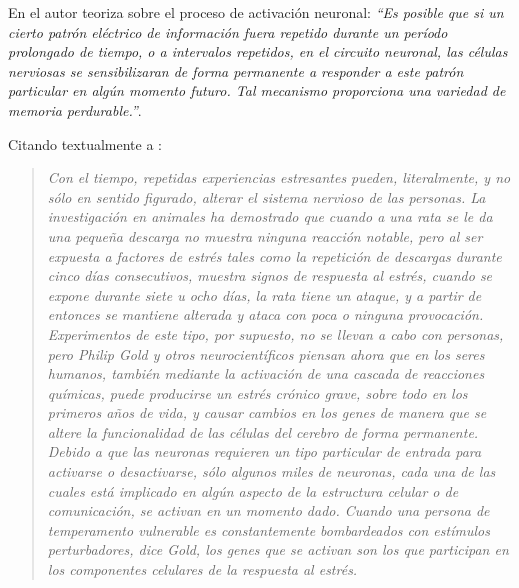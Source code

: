 
En \cite{MacLean} el autor teoriza sobre el proceso de activación neuronal: {\it ``Es posible que si un cierto patrón eléctrico de información fuera repetido durante un período prolongado de tiempo, o a intervalos repetidos, en el circuito neuronal, las células nerviosas se sensibilizaran de forma permanente a responder a este patrón particular en algún momento futuro. Tal mecanismo proporciona una variedad de memoria perdurable.''}.

Citando textualmente a \cite{Gallagher}:

\begin{quote}  
{\it Con el tiempo, repetidas experiencias estresantes pueden, literalmente, y no sólo en sentido figurado, alterar el sistema nervioso de las personas. La investigación en animales ha demostrado que cuando a una rata se le da una pequeña descarga no muestra ninguna reacción notable, pero al ser expuesta a factores de estrés tales como la repetición de descargas durante cinco días consecutivos, muestra signos de respuesta al estrés, cuando se expone durante siete u ocho días, la rata tiene un ataque, y a partir de entonces se mantiene alterada y ataca con poca o ninguna provocación. Experimentos de este tipo, por supuesto, no se llevan a cabo con personas, pero Philip Gold y otros neurocientíficos piensan ahora que en los seres humanos, también mediante la activación de una cascada de reacciones químicas, puede producirse un estrés crónico grave, sobre todo en los primeros años de vida, y causar cambios en los genes de manera que se altere la funcionalidad de las células del cerebro de forma permanente. Debido a que las neuronas requieren un tipo particular de entrada para activarse o desactivarse, sólo algunos miles de neuronas, cada una de las cuales está implicado en algún aspecto de la estructura celular o de comunicación, se activan en un momento dado. Cuando una persona de temperamento vulnerable es constantemente bombardeados con estímulos perturbadores, dice Gold, los genes que se activan son los que participan en los componentes celulares de la respuesta al estrés.}
\end{quote}


